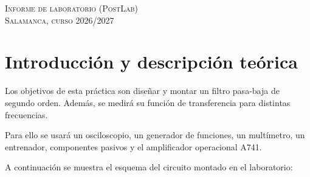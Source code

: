 \documentclass[a4paper,11pt]{article}
\newcommand{\uA}{\textmu A741}
\begin{document}
\begin{titlepage}
\vspace{0.4cm}
\begin{center}
  {\color{navy}\textsc{Informe de laboratorio (PostLab)}}\\[0.2em]
  {\color{gris}\small\textsc{Salamanca, curso 2026/2027}}
\end{center}
\end{titlepage}
\restoregeometry

\setcounter{page}{1}

\section{Introducción y descripción teórica}
Los objetivos de esta práctica son diseñar y montar un filtro pasa-baja de segundo orden. Además, se medirá su función de transferencia para distintas frecuencias.

Para ello se usará un osciloscopio, un generador de funciones, un multímetro, un entrenador, componentes pasivos y el amplificador operacional \uA.

A continuación se muestra el esquema del circuito montado en el laboratorio:
\end{document}
